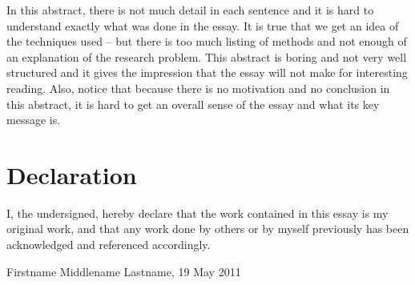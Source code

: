 In this abstract, there is not much detail in each sentence and it is hard to understand exactly what was done in the essay. It is true that we get an idea of the techniques used -- but there is too much listing of methods and not enough of an explanation of the research problem. This abstract is boring and not very well structured and it gives the impression that the essay will not make for interesting reading. Also, notice that because there is no motivation and no conclusion in this abstract, it is hard to get an overall sense of the essay and what its key message is.



\vfill
\section*{Declaration}
I, the undersigned, hereby declare that the work contained in this essay is my original work, and that any work done by others or by myself previously has been acknowledged and referenced accordingly.

Firstname Middlename Lastname, 19 May 2011
